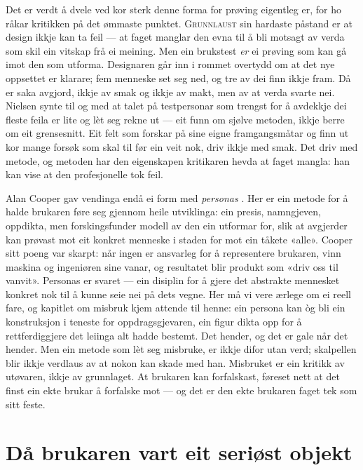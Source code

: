 Det er verdt å dvele ved kor sterk denne forma for prøving eigentleg er, for ho råkar kritikken på det ømmaste punktet. \textsc{Grunnlaust} sin hardaste påstand er at design ikkje kan ta feil — at faget manglar den evna til å bli motsagt av verda som skil ein vitskap frå ei meining. Men ein brukstest \emph{er} ei prøving som kan gå imot den som utforma. Designaren går inn i rommet overtydd om at det nye oppsettet er klarare; fem menneske set seg ned, og tre av dei finn ikkje fram. Då er saka avgjord, ikkje av smak og ikkje av makt, men av at verda svarte nei. Nielsen synte til og med at talet på testpersonar som trengst for å avdekkje dei fleste feila er lite og lèt seg rekne ut — eit funn om sjølve metoden, ikkje berre om eit grensesnitt. Eit felt som forskar på sine eigne framgangsmåtar og finn ut kor mange forsøk som skal til før ein veit nok, driv ikkje med smak. Det driv med metode, og metoden har den eigenskapen kritikaren hevda at faget mangla: han kan vise at den profesjonelle tok feil.

Alan Cooper gav vendinga endå ei form med \emph{personas} \autocite{cooper1999inmates}. Her er ein metode for å halde brukaren føre seg gjennom heile utviklinga: ein presis, namngjeven, oppdikta, men forskingsfunder modell av den ein utformar for, slik at avgjerder kan prøvast mot eit konkret menneske i staden for mot ein tåkete «alle». Cooper sitt poeng var skarpt: når ingen er ansvarleg for å representere brukaren, vinn maskina og ingeniøren sine vanar, og resultatet blir produkt som «driv oss til vanvit». Personas er svaret — ein disiplin for å gjere det abstrakte mennesket konkret nok til å kunne seie nei på dets vegne. Her må vi vere ærlege om ei reell fare, og kapitlet om misbruk kjem attende til henne: ein persona kan òg bli ein konstruksjon i teneste for oppdragsgjevaren, ein figur dikta opp for å rettferdiggjere det leiinga alt hadde bestemt. Det hender, og det er gale når det hender. Men ein metode som lèt seg misbruke, er ikkje difor utan verd; skalpellen blir ikkje verdlaus av at nokon kan skade med han. Misbruket er ein kritikk av utøvaren, ikkje av grunnlaget. At brukaren kan forfalskast, føreset nett at det finst ein ekte brukar å forfalske mot — og det er den ekte brukaren faget tek som sitt feste.

\section{Då brukaren vart eit seriøst objekt}

